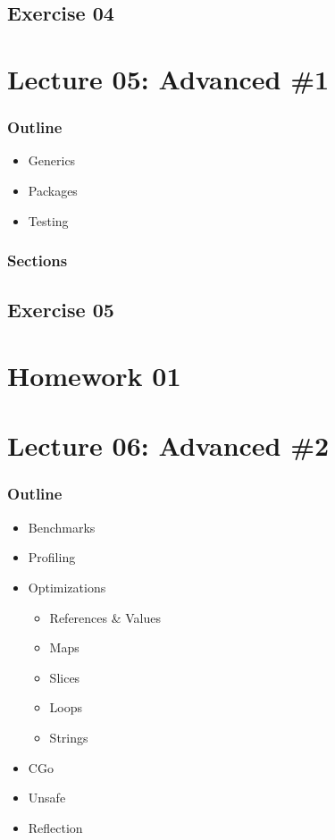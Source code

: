 \documentclass[
  digital,
  color,
  oneside,
  nosansbold,
  nocolorbold,
  lof,
  lot,
]{fithesis4}
\begin{document}
\subsection{Exercise 04}

\section{Lecture 05: Advanced \#1}

\subsubsection{Outline}

\begin{itemize}
    \item Generics
    \item Packages
    \item Testing
\end{itemize}

\subsubsection{Sections}

\subsection{Exercise 05}

\section{Homework 01}

\section{Lecture 06: Advanced \#2}

\subsubsection{Outline}

\begin{itemize}
    \item Benchmarks
    \item Profiling
    \item Optimizations
    \begin{itemize}
        \item References \& Values
        \item Maps
        \item Slices
        \item Loops
        \item Strings
    \end{itemize}
    \item CGo
    \item Unsafe
    \item Reflection
\end{itemize}
\end{document}
